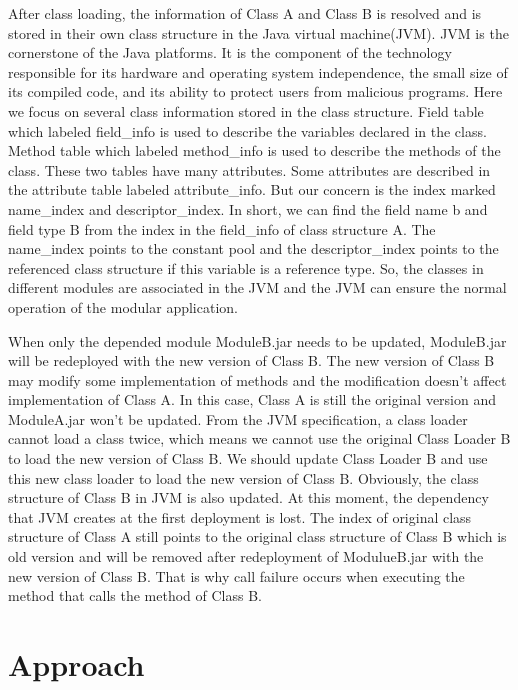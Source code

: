 \documentclass[conference]{IEEEtran}
\begin{document}
After class loading, the information of Class A and Class B is resolved and is stored in their own class structure in the Java virtual machine(JVM).
JVM is the cornerstone of the Java platforms. It is the component of the technology responsible for its hardware and operating system independence, the small size of its compiled code, and its ability to protect users from malicious programs\cite{jvm}.
Here we focus on several class information stored in the class structure.
Field table which labeled field\_info is used to describe the variables declared in the class.
Method table which labeled method\_info is used to describe the methods of the class.
These two tables have many attributes.
Some attributes are described in the attribute table labeled attribute\_info.
But our concern is the index marked name\_index and descriptor\_index.
In short, we can find the field name b and field type B from the index in the field\_info of class structure A.
The name\_index points to the constant pool and the descriptor\_index points to the referenced class structure if this variable is a reference type.
So, the classes in different modules are associated in the JVM and the JVM can ensure the normal operation of the modular application.
 
When only the depended module ModuleB.jar needs to be updated, ModuleB.jar will be redeployed with the new version of Class B.
The new version of Class B may modify some implementation of methods and the modification doesn't affect implementation of Class A.
In this case, Class A is still the original version and ModuleA.jar won't be updated.
From the JVM specification\cite{jvm_specification}, a class loader cannot load a class twice, which means we cannot use the original Class Loader B to load the new version of Class B.
We should update Class Loader B and use this new class loader to load the new version of Class B.
Obviously, the class structure of Class B in JVM is also updated.
At this moment, the dependency that JVM creates at the first deployment is lost.
The index of original class structure of Class A still points to the original class structure of Class B which is old version and will be removed after redeployment of ModulueB.jar with the new version of Class B.
That is why call failure occurs when executing the method that calls the method of Class B.  




\section{Approach\label{sec:approach}}
\end{document}
